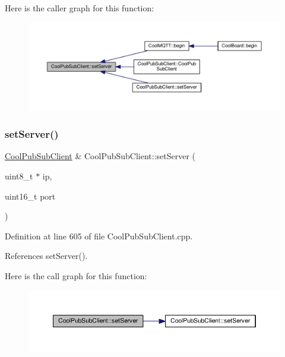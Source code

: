 Here is the caller graph for this function\+:
\nopagebreak
\begin{figure}[H]
\begin{center}
\leavevmode
\includegraphics[width=350pt]{d8/d4b/class_cool_pub_sub_client_a947e70c394c66c7d08d0c53caf8425e3_icgraph}
\end{center}
\end{figure}
\mbox{\label{class_cool_pub_sub_client_ad589f977fc2799b9341dc5f4fcdb483a}} 
\subsubsection{\texorpdfstring{set\+Server()}{setServer()}\hspace{0.1cm}{\footnotesize\ttfamily [2/3]}}
{\footnotesize\ttfamily \hyperlink{class_cool_pub_sub_client}{Cool\+Pub\+Sub\+Client} \& Cool\+Pub\+Sub\+Client\+::set\+Server (\begin{DoxyParamCaption}\item[{uint8\+\_\+t $\ast$}]{ip,  }\item[{uint16\+\_\+t}]{port }\end{DoxyParamCaption})}



Definition at line 605 of file Cool\+Pub\+Sub\+Client.\+cpp.



References set\+Server().

Here is the call graph for this function\+:
\nopagebreak
\begin{figure}[H]
\begin{center}
\leavevmode
\includegraphics[width=350pt]{d8/d4b/class_cool_pub_sub_client_ad589f977fc2799b9341dc5f4fcdb483a_cgraph}
\end{center}
\end{figure}
\mbox{\label{class_cool_pub_sub_client_a333ea9369dc88bb14d3fa6216e731c09}} 
